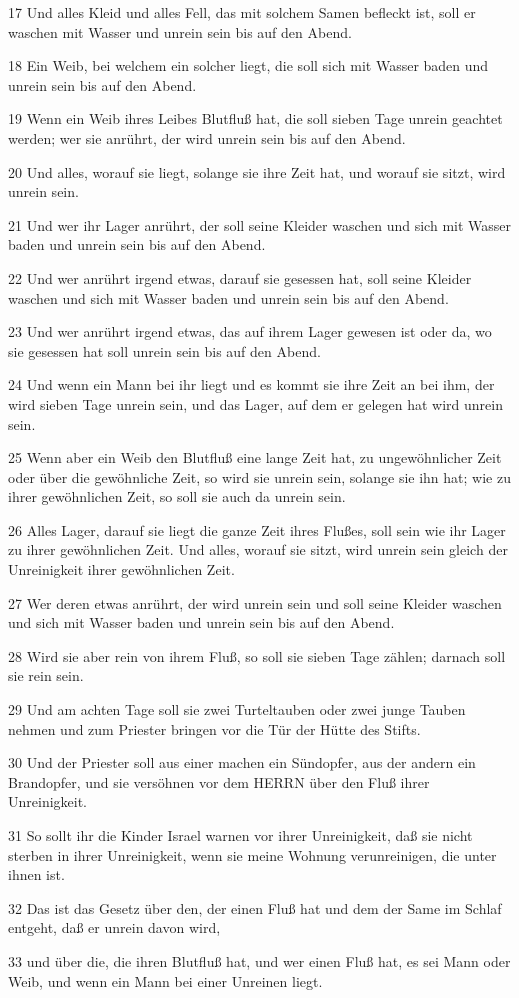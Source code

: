 \par 17 Und alles Kleid und alles Fell, das mit solchem Samen befleckt ist, soll er waschen mit Wasser und unrein sein bis auf den Abend.
\par 18 Ein Weib, bei welchem ein solcher liegt, die soll sich mit Wasser baden und unrein sein bis auf den Abend.
\par 19 Wenn ein Weib ihres Leibes Blutfluß hat, die soll sieben Tage unrein geachtet werden; wer sie anrührt, der wird unrein sein bis auf den Abend.
\par 20 Und alles, worauf sie liegt, solange sie ihre Zeit hat, und worauf sie sitzt, wird unrein sein.
\par 21 Und wer ihr Lager anrührt, der soll seine Kleider waschen und sich mit Wasser baden und unrein sein bis auf den Abend.
\par 22 Und wer anrührt irgend etwas, darauf sie gesessen hat, soll seine Kleider waschen und sich mit Wasser baden und unrein sein bis auf den Abend.
\par 23 Und wer anrührt irgend etwas, das auf ihrem Lager gewesen ist oder da, wo sie gesessen hat soll unrein sein bis auf den Abend.
\par 24 Und wenn ein Mann bei ihr liegt und es kommt sie ihre Zeit an bei ihm, der wird sieben Tage unrein sein, und das Lager, auf dem er gelegen hat wird unrein sein.
\par 25 Wenn aber ein Weib den Blutfluß eine lange Zeit hat, zu ungewöhnlicher Zeit oder über die gewöhnliche Zeit, so wird sie unrein sein, solange sie ihn hat; wie zu ihrer gewöhnlichen Zeit, so soll sie auch da unrein sein.
\par 26 Alles Lager, darauf sie liegt die ganze Zeit ihres Flußes, soll sein wie ihr Lager zu ihrer gewöhnlichen Zeit. Und alles, worauf sie sitzt, wird unrein sein gleich der Unreinigkeit ihrer gewöhnlichen Zeit.
\par 27 Wer deren etwas anrührt, der wird unrein sein und soll seine Kleider waschen und sich mit Wasser baden und unrein sein bis auf den Abend.
\par 28 Wird sie aber rein von ihrem Fluß, so soll sie sieben Tage zählen; darnach soll sie rein sein.
\par 29 Und am achten Tage soll sie zwei Turteltauben oder zwei junge Tauben nehmen und zum Priester bringen vor die Tür der Hütte des Stifts.
\par 30 Und der Priester soll aus einer machen ein Sündopfer, aus der andern ein Brandopfer, und sie versöhnen vor dem HERRN über den Fluß ihrer Unreinigkeit.
\par 31 So sollt ihr die Kinder Israel warnen vor ihrer Unreinigkeit, daß sie nicht sterben in ihrer Unreinigkeit, wenn sie meine Wohnung verunreinigen, die unter ihnen ist.
\par 32 Das ist das Gesetz über den, der einen Fluß hat und dem der Same im Schlaf entgeht, daß er unrein davon wird,
\par 33 und über die, die ihren Blutfluß hat, und wer einen Fluß hat, es sei Mann oder Weib, und wenn ein Mann bei einer Unreinen liegt.

